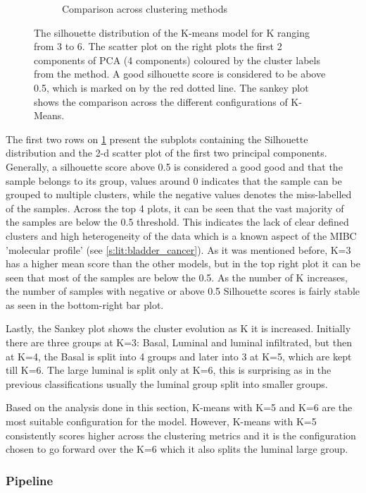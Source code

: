 \begin{figure}[H]
\begin{subfigure}[!t]{0.65\textwidth}
        \caption{Comparison across clustering methods}
    \end{subfigure}
    \centering
    \caption{The silhouette distribution of the K-means model for K ranging from 3 to 6. The scatter plot on the right plots the first 2 components of PCA (4 components) coloured by the cluster labels from the method. A good silhouette score is considered to be above 0.5, which is marked on by the red dotted line. The sankey plot shows the comparison across the different configurations of K-Means.}
    \label{fig:cs:sill_distrib}
\end{figure}


The first two rows on \cref{fig:cs:sill_distrib} present the subplots containing the Silhouette distribution and the 2-d scatter plot of the first two principal components. Generally, a silhouette score above 0.5 is considered a good good and that the sample belongs to its group, values around 0 indicates that the sample can be grouped to multiple clusters, while the negative values denotes the miss-labelled of the samples. Across the top 4 plots, it can be seen that the vast majority of the samples are below the 0.5 threshold. This indicates the lack of clear defined clusters and high heterogeneity of the data which is a known aspect of the MIBC 'molecular profile' (see \cref{s:lit:bladder_cancer}). As it was mentioned before, K=3 has a higher mean score than the other models, but in the top right plot it can be seen that most of the samples are below the 0.5. As the number of K increases, the number of samples with negative or above 0.5 Silhouette scores is fairly stable as seen in the bottom-right bar plot. 

Lastly, the Sankey plot shows the cluster evolution as K it is increased. Initially there are three groups at K=3: Basal, Luminal and luminal infiltrated, but then at K=4, the Basal is split into 4 groups and later into 3 at K=5, which are kept till K=6. The large luminal is split only at K=6, this is surprising as in the previous classifications usually the luminal group split into smaller groups.

Based on the analysis done in this section, K-means with K=5 and K=6 are the most suitable configuration for the model. However, K-means with K=5 consistently scores higher across the clustering metrics and it is the configuration chosen to go forward over the K=6 which it also splits the luminal large group.

\subsubsection{Pipeline}

